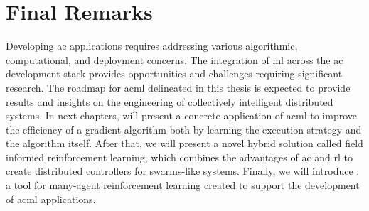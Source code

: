 \section{Final Remarks}
%
Developing \ac{ac} applications
 requires addressing
 various
 algorithmic,
 computational,
 and deployment concerns.
%
The integration of \ac{ml} 
 across the \ac{ac} development stack
 provides opportunities and challenges
 requiring significant research.
%
The roadmap for \ac{acml} delineated in this thesis
 is expected to provide results and insights
 on the engineering of collectively intelligent distributed systems.
%
In next chapters, 
% 
will present a concrete application of \ac{acml} to improve the efficiency of a gradient algorithm
 both by learning the execution strategy and the algorithm itself.
%
After that, we will present a novel hybrid solution called field informed reinforcement learning, 
 which combines the advantages of \ac{ac} and \ac{rl} to create distributed controllers for swarms-like systems.
%
Finally, we will introduce \scarlib{}: a tool for many-agent reinforcement learning created to support the development of \ac{acml} applications.
 
